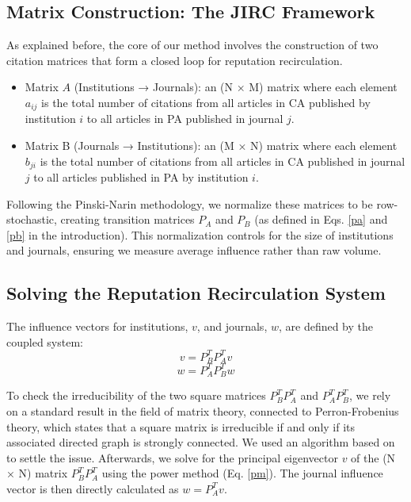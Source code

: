 \documentclass[10pt]{article}
\begin{document}
\subsection{Matrix Construction: The JIRC Framework}
As explained before, the core of our method involves the construction of two citation matrices that form a closed loop for reputation recirculation.

\begin{itemize}
\item Matrix $A$ (Institutions → Journals): an (N × M) matrix where each element $a_{ij}$ is the total number of citations from all articles in CA published by institution $i$ to all articles in PA published in journal $j$.
\item Matrix B (Journals → Institutions): an (M × N) matrix where each element \(b_{ji}\) is the total number of citations from all articles in CA published in journal $j$ to all articles published in PA by institution $i$.
    \end{itemize}
Following the Pinski-Narin methodology, we normalize these matrices to be row-stochastic, creating transition matrices \(P_A\) and \(P_B\) (as defined in Eqs. \ref{pa}  and \ref{pb} in the introduction). This normalization controls for the size of institutions and journals, ensuring we measure average influence rather than raw volume.
\subsection{Solving the Reputation Recirculation System}
The influence vectors for institutions, $v$, and journals, $w$, are defined by the coupled system:
\[ v = P_B^T P_A^T v \]
\[ w = P_A^T P_B^T w \]

To check the irreducibility of the two square matrices \(P_B^T P_A^T\) and \(P_A^T P_B^T\), we rely on a standard result in the field of matrix theory, connected to Perron-Frobenius theory, which states that a square matrix is irreducible if and only if its associated directed graph is strongly connected. We  used an algorithm based on \cite{Dijkstra} to settle the issue. Afterwards,
we solve for the principal eigenvector $v$ of the (N × N) matrix \(P_B^T P_A^T\) using the power method (Eq. \ref{pm}). The journal influence vector is then directly calculated as \(w = P_A^T v\).
\end{document}

